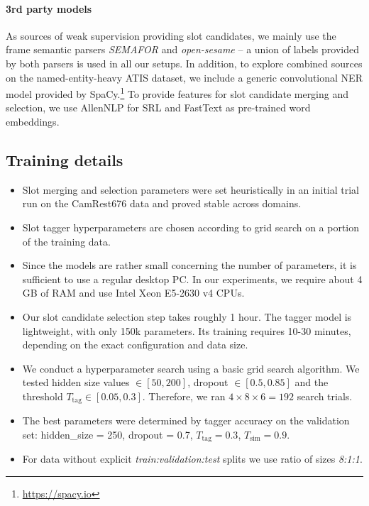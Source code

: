 \paragraph{3rd party models}
As sources of weak supervision providing slot candidates, we mainly use the frame semantic parsers \textit{SEMAFOR} \cite{das2010semafor} and \textit{open-sesame} \cite{swayamdipta2017frame} -- a union of labels provided by both parsers is used in all our setups. In addition, to explore combined sources on the named-entity-heavy ATIS dataset, we include a generic convolutional NER model provided by SpaCy.\footnote{\url{https://spacy.io}}
To provide features for slot candidate merging and selection, we use AllenNLP \cite{Gardner2017AllenNLP} for SRL
and FastText \cite{bojanowski2017enriching} as pre-trained word embeddings.

\subsection{Training details}
\begin{itemize}
    \item Slot merging and selection parameters were set heuristically in an initial trial run on the CamRest676 data and proved stable across domains.
    \item Slot tagger hyperparameters are chosen according to grid search on a portion of the training data.
    \item Since the models are rather small concerning the number of parameters, it is sufficient to use a regular desktop PC. In our experiments, we require about 4 GB of RAM and use Intel Xeon E5-2630 v4 CPUs. 
    \item Our slot candidate selection step takes roughly 1 hour.
    The tagger model is lightweight, with only 150k parameters. Its training requires 10-30 minutes, depending on the exact configuration and data size.
    \item We conduct a hyperparameter search using a basic grid search algorithm. We tested hidden size values $\in [50,200]$, dropout $\in [0.5,0.85]$ and the threshold $T_{\text{tag}} \in [0.05,0.3]$. Therefore, we ran $4\times8\times6 = 192$ search trials.
    \item The best parameters were determined by tagger accuracy on the validation set: hidden\_size = 250, dropout = 0.7, $T_{\text{tag}} = 0.3$, $T_{\text{sim}} = 0.9$.
    \item For data without explicit \emph{train:validation:test} splits we use ratio of sizes \emph{8:1:1}.
\end{itemize}

